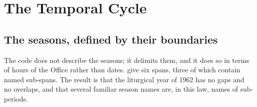 \section{The Temporal Cycle}

\subsection{The seasons, defined by their boundaries}

The code does not describe the seasons; it delimits them, and it does so in terms of hours of
the Office rather than dates.  give six spans, three of which contain named
sub-spans. The result is that the liturgical year of 1962 has no gaps and no overlaps, and that
several familiar season names are, in this law, names of sub-periods.

